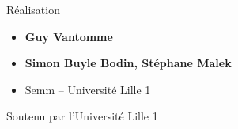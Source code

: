 \begin{frame}
\begin{minipage}{0.65\textwidth}
  \medskip

  Réalisation
  \begin{itemize}
    \item {\bf Guy Vantomme}
    \item {\bf \small Simon Buyle Bodin, Stéphane Malek}     
    \item Semm -- Université Lille 1
  \end{itemize}

  \medskip

  Soutenu par l'Université Lille 1


  \end{minipage}  



\end{frame}


